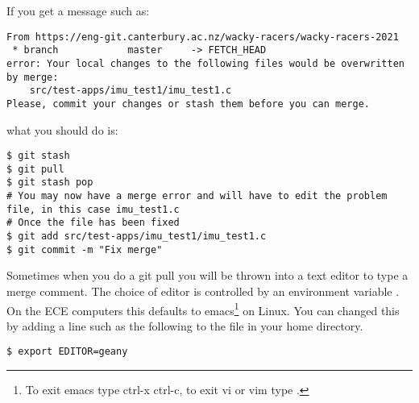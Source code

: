If you get a message such as:
%
\begin{verbatim}
From https://eng-git.canterbury.ac.nz/wacky-racers/wacky-racers-2021
 * branch            master     -> FETCH_HEAD
error: Your local changes to the following files would be overwritten by merge:
    src/test-apps/imu_test1/imu_test1.c
Please, commit your changes or stash them before you can merge.
\end{verbatim}
%
what you should do is:
%
\begin{verbatim}
$ git stash
$ git pull
$ git stash pop
# You may now have a merge error and will have to edit the problem file, in this case imu_test1.c
# Once the file has been fixed
$ git add src/test-apps/imu_test1/imu_test1.c
$ git commit -m "Fix merge"
\end{verbatim}

Sometimes when you do a git pull you will be thrown into a text editor
to type a merge comment. The choice of editor is controlled by an
environment variable . On the ECE computers this defaults
to emacs\footnote{To exit emacs type ctrl-x ctrl-c, to exit vi or vim
  type .}  on Linux. You can changed this by adding a line
such as the following to the  file in your home
directory.

\begin{verbatim}
$ export EDITOR=geany
\end{verbatim}
